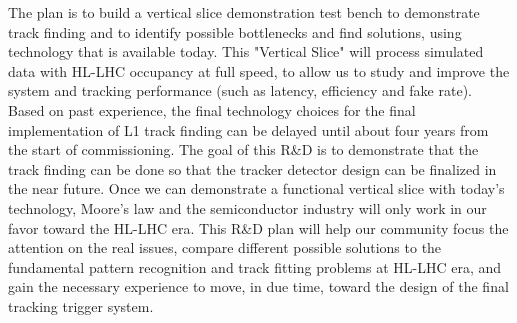	The plan is to build a vertical slice demonstration test bench to demonstrate track finding and to identify possible bottlenecks and find solutions, using technology that is available today. This "Vertical Slice" will process simulated data with HL-LHC occupancy at full speed, to allow us to study and improve the system and tracking performance (such as latency, efficiency and fake rate). Based on past experience, the final technology choices for the final implementation of L1 track finding can be delayed until about four years from the start of commissioning. The goal of this R\&D is to demonstrate that the track finding can be done so that the tracker detector design can be finalized in the near future. Once we can demonstrate a functional vertical slice with today's technology, Moore's law and the semiconductor industry will only work in our favor toward the HL-LHC era. This R\&D plan will help our community focus the attention on the real issues, compare different possible solutions to the fundamental pattern recognition and track fitting problems at HL-LHC era, and gain the necessary experience to move, in due time, toward the design of the final tracking trigger system.

